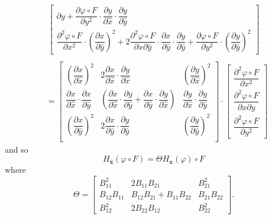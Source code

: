 \begin{align*}
\begin{bmatrix}
{      \partial y} + \dfrac{\partial \varphi\circ F}{\partial y^2}\cdot
      \dfrac{\partial y}{\partial \hat{x}} \cdot \dfrac{\partial y}{\partial
      \hat{y}} \\[1em]
    \dfrac{\partial^2 \varphi\circ F}{\partial x^2}\cdot \left(\dfrac{\partial
      x}{\partial \hat{y}}\right)^2 + 2 \dfrac{\partial^2 \varphi\circ F}{\partial x
      \partial \hat{y}} \cdot \dfrac{\partial x}{\partial \hat{y}} \cdot
      \dfrac{\partial y}{\partial \hat{y}} + \dfrac{\partial \varphi\circ
      F}{\partial y^2}\cdot \left(\dfrac{\partial y}{\partial \hat{y}}\right)^2
  \end{bmatrix} \\
\end{align*}
\begin{align*}
  &= \begin{bmatrix}
    \left(\dfrac{\partial x}{\partial \hat{x}}\right)^2
      & 2 \dfrac{\partial x}{\partial \hat{x}}\cdot \dfrac{\partial y}{\partial \hat{x}}
      & \left(\dfrac{\partial y}{\partial \hat{x}}\right)^2 \\[1em]
    \dfrac{\partial x}{\partial \hat{x}}\cdot \dfrac{\partial x}{\partial \hat{y}}
      & \left(\dfrac{\partial x}{\partial \hat{x}}\cdot \dfrac{\partial y}{\partial
      \hat{y}} + \dfrac{\partial x}{\partial \hat{y}}\cdot
      \dfrac{\partial y}{\partial \hat{x}} \right)
      & \dfrac{\partial y}{\partial \hat{x}} \cdot \dfrac{\partial y}{\partial \hat{y}} \\[1em]
    \left(\dfrac{\partial x}{\partial \hat{y}}\right)^2
      & 2 \dfrac{\partial x}{\partial \hat{y}}\cdot \dfrac{\partial y}{\partial \hat{y}}
      & \left(\dfrac{\partial y}{\partial \hat{y}}\right)^2 \\[1em]
  \end{bmatrix}\cdot \begin{bmatrix}
    \dfrac{\partial^2 \varphi\circ F}{\partial x^2} \\[1em]
    \dfrac{\partial^2 \varphi\circ F}{\partial x \partial y} \\[1em]
    \dfrac{\partial^2 \varphi\circ F}{\partial y^2}
  \end{bmatrix}
\end{align*}
and so
\begin{equation}
  H_{\mathbf{\hat{x}}}(\varphi\circ F) = \Theta H_{\mathbf{x}}(\varphi)\circ F
  \label{eqn:Hessian}
\end{equation}
where
\begin{equation*}
  \Theta = \begin{bmatrix}
    B_{11}^2 & 2B_{11}B_{21} & B_{21}^2 \\[0.5em]
    B_{12}B_{11} & B_{12}B_{21} + B_{11}B_{22} & B_{21}B_{22} \\[0.5em]
    B_{12}^2 & 2B_{22}B_{12} & B_{22}^2
  \end{bmatrix}.
\end{equation*}

